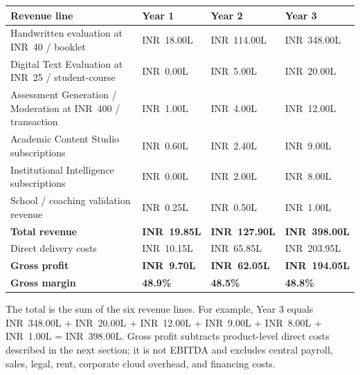 \documentclass[11pt,a4paper]{article}
\newcommand{\rs}{INR}
\begin{document}
\begin{tabularx}{\textwidth}{Y>{\raggedleft\arraybackslash}p{0.17\textwidth}>{\raggedleft\arraybackslash}p{0.17\textwidth}>{\raggedleft\arraybackslash}p{0.17\textwidth}}
\toprule
\textbf{Revenue line} & \textbf{Year 1} & \textbf{Year 2} & \textbf{Year 3} \\
\midrule
Handwritten evaluation at \rs\ 40 / booklet & \rs\ 18.00L & \rs\ 114.00L & \rs\ 348.00L \\
Digital Text Evaluation at \rs\ 25 / student-course & \rs\ 0.00L & \rs\ 5.00L & \rs\ 20.00L \\
Assessment Generation / Moderation at \rs\ 400 / transaction & \rs\ 1.00L & \rs\ 4.00L & \rs\ 12.00L \\
Academic Content Studio subscriptions & \rs\ 0.60L & \rs\ 2.40L & \rs\ 9.00L \\
Institutional Intelligence subscriptions & \rs\ 0.00L & \rs\ 2.00L & \rs\ 8.00L \\
School / coaching validation revenue & \rs\ 0.25L & \rs\ 0.50L & \rs\ 1.00L \\
\midrule
\textbf{Total revenue} & \textbf{\rs\ 19.85L} & \textbf{\rs\ 127.90L} & \textbf{\rs\ 398.00L} \\
Direct delivery costs & \rs\ 10.15L & \rs\ 65.85L & \rs\ 203.95L \\
\textbf{Gross profit} & \textbf{\rs\ 9.70L} & \textbf{\rs\ 62.05L} & \textbf{\rs\ 194.05L} \\
\textbf{Gross margin} & \textbf{48.9\%} & \textbf{48.5\%} & \textbf{48.8\%} \\
\bottomrule
\end{tabularx}

The total is the sum of the six revenue lines. For example, Year 3 equals \rs\ 348.00L + \rs\ 20.00L + \rs\ 12.00L + \rs\ 9.00L + \rs\ 8.00L + \rs\ 1.00L = \rs\ 398.00L. Gross profit subtracts product-level direct costs described in the next section; it is not EBITDA and excludes central payroll, sales, legal, rent, corporate cloud overhead, and financing costs.
\end{document}
